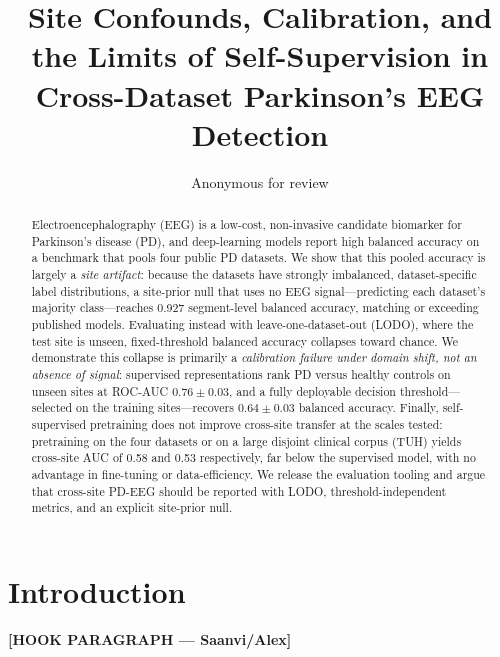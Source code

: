 \documentclass[runningheads]{llncs}
\begin{document}
\title{Site Confounds, Calibration, and the Limits of Self-Supervision in Cross-Dataset Parkinson's EEG Detection}
\author{Anonymous for review}
\maketitle

\begin{abstract}
Electroencephalography (EEG) is a low-cost, non-invasive candidate biomarker for Parkinson's disease (PD), and deep-learning models report high balanced accuracy on a benchmark that pools four public PD datasets. We show that this pooled accuracy is largely a \emph{site artifact}: because the datasets have strongly imbalanced, dataset-specific label distributions, a site-prior null that uses no EEG signal---predicting each dataset's majority class---reaches 0.927 segment-level balanced accuracy, matching or exceeding published models. Evaluating instead with leave-one-dataset-out (LODO), where the test site is unseen, fixed-threshold balanced accuracy collapses toward chance. We demonstrate this collapse is primarily a \emph{calibration failure under domain shift, not an absence of signal}: supervised representations rank PD versus healthy controls on unseen sites at ROC-AUC $0.76\pm0.03$, and a fully deployable decision threshold---selected on the training sites---recovers $0.64\pm0.03$ balanced accuracy. Finally, self-supervised pretraining does not improve cross-site transfer at the scales tested: pretraining on the four datasets or on a large disjoint clinical corpus (TUH) yields cross-site AUC of 0.58 and 0.53 respectively, far below the supervised model, with no advantage in fine-tuning or data-efficiency. We release the evaluation tooling and argue that cross-site PD-EEG should be reported with LODO, threshold-independent metrics, and an explicit site-prior null.
\end{abstract}

\section{Introduction}
\textbf{[HOOK PARAGRAPH — Saanvi/Alex]}
\end{document}
